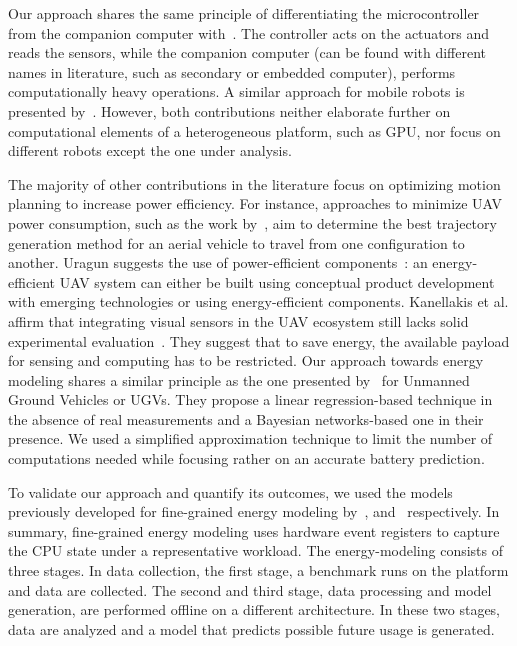 Our approach shares the same principle of differentiating the microcontroller from the companion computer with~\citep{mei2004energy, mei2005case}. The controller acts on the actuators and reads the sensors, while the companion computer (can be found with different names in literature, such as secondary or embedded computer), performs computationally heavy operations. A similar approach for mobile robots is presented by~\citep{dressler2005energy}. However, both contributions neither elaborate further on computational elements of a heterogeneous platform, such as GPU, nor focus on different robots except the one under analysis.

The majority of other contributions in the literature focus on optimizing motion planning to increase power efficiency. For instance, approaches to minimize UAV power consumption, such as the work by~\citep{kreciglowa2017energy}, aim to determine the best trajectory generation method for an aerial vehicle to travel from one configuration to another. Uragun suggests the use of power-efficient components~\citep{uragun2011energy}: an energy-efficient UAV system can either be built using conceptual product development with emerging technologies or using energy-efficient components. Kanellakis et al. affirm that integrating visual sensors in the UAV ecosystem still lacks solid experimental evaluation~\citep{kanellakis2017survey}. They suggest that to save energy, the available payload for sensing and computing has to be restricted. Our approach towards energy modeling shares a similar principle as the one presented by~\citep{sadrpour2013mission, sadrpour2013experimental} for Unmanned Ground Vehicles or UGVs. They propose a linear regression-based technique in the absence of real measurements and a Bayesian networks-based one in their presence. We used a simplified approximation technique to limit the number of computations needed while focusing rather on an accurate battery prediction.

To validate our approach and quantify its outcomes, we used the models previously developed for fine-grained energy modeling by~\citep{nunez2013enabling}, and~\citep{nikov2015evaluation} respectively. In summary, fine-grained energy modeling uses hardware event registers to capture the CPU state under a representative workload. The energy-modeling consists of three stages. In data collection, the first stage, a benchmark runs on the platform and data are collected. The second and third stage, data processing and model generation, are performed offline on a different architecture. In these two stages, data are analyzed and a model that predicts possible future usage is generated. 

